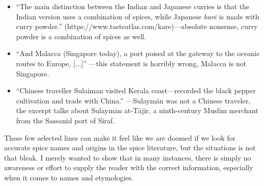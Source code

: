 \begin{itemize}
    \item ``The main distinction between the Indian and Japanese curries is that the Indian version uses a combination of spices, while Japanese \textit{karē} is made with curry powder.'' (https://www.tasteatlas.com/kare)---absolute nonsense, curry powder is a combination of spices as well.
    \item ``And Malacca (Singapore today), a port poised at the gateway to the oceanic routes to Europe, [...]'' \autocite[vi]{hill_contemporary_2004}---this statement is horribly wrong, Malacca is not Singapore.
    \item ``Chinese traveller Sulaiman visited Kerala coast—recorded the black pepper cultivation and trade with China.'' \autocite[3]{ravindran_black_2000}---Sulaymān was not a Chinese traveler, the excerpt talks about Sulaymān at-Tājir, a ninth-century Muslim merchant from the Sassanid port of Siraf.
\end{itemize}





These few selected lines can make it feel like we are doomed if we look for accurate spice names and origins in the spice literature, but the situations is not that bleak. I merely wanted to show that in many instances, there is simply no awareness or effort to supply the reader with the correct information, especially when it comes to names and etymologies.

